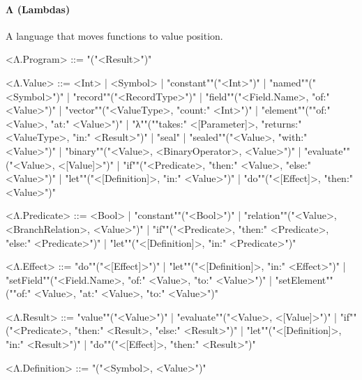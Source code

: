 \documentclass[main.tex]{subfiles}
\begin{document}
\par
\paragraph{ Λ (Lambdas) } A language that moves functions to value position.
\begin{grammar}
	\footnotesize
				<Λ.Program> ::=
							"("<Result>")"
				\par
				<Λ.Value> ::=
						<Int> |
								<Symbol> |
						"constant""("<Int>")"
						| "named""("<Symbol>")"
						| "record""("<RecordType>")"
						| "field""("<Field.Name>, "of:" <Value>")"
						| "vector""("<ValueType>, "count:" <Int>")"
						| "element""(""of:" <Value>, "at:" <Value>")"
						| "λ""(""takes:" <[Parameter]>, "returns:" <ValueType>, "in:" <Result>")"
						| "seal"
						| "sealed""("<Value>, "with:" <Value>")"
						| "binary""("<Value>, <BinaryOperator>, <Value>")"
						| "evaluate""("<Value>, <[Value]>")"
						| "if""("<Predicate>, "then:" <Value>, "else:" <Value>")"
						| "let""("<[Definition]>, "in:" <Value>")"
						| "do""("<[Effect]>, "then:" <Value>")"
				\par
				<Λ.Predicate> ::=
						<Bool> |
						"constant""("<Bool>")"
						| "relation""("<Value>, <BranchRelation>, <Value>")"
						| "if""("<Predicate>, "then:" <Predicate>, "else:" <Predicate>")"
						| "let""("<[Definition]>, "in:" <Predicate>")"
				\par
				<Λ.Effect> ::=
						"do""("<[Effect]>")"
						| "let""("<[Definition]>, "in:" <Effect>")"
						| "setField""("<Field.Name>, "of:" <Value>, "to:" <Value>")"
						| "setElement""(""of:" <Value>, "at:" <Value>, "to:" <Value>")"
				\par
				<Λ.Result> ::=
						"value""("<Value>")"
						| "evaluate""("<Value>, <[Value]>")"
						| "if""("<Predicate>, "then:" <Result>, "else:" <Result>")"
						| "let""("<[Definition]>, "in:" <Result>")"
						| "do""("<[Effect]>, "then:" <Result>")"
				\par
				<Λ.Definition> ::=
							"("<Symbol>, <Value>")"
				\par
\end{grammar}
\par
\end{document}
